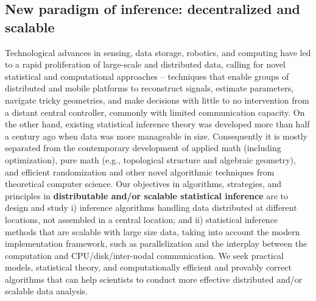 \documentclass[12pt]{article}
\begin{document}
\vspace*{-1em}

\subsection{New paradigm of inference: decentralized and scalable}
\label{sec:sub-decentralized}


Technological advances in sensing, data storage, robotics, and computing have led to a rapid proliferation of large-scale and distributed data, calling for novel statistical and computational approaches -- techniques that enable groups of distributed and mobile platforms to reconstruct signals, estimate parameters, navigate tricky geometries, and make decisions with little to no intervention from a distant central controller, commonly with limited communication capacity.
On the other hand, existing statistical inference theory was developed more than half a century ago when data was more manageable in size.  Consequently it is mostly separated from the contemporary development of applied math (including optimization), pure math (e.g., topological structure and algebraic geometry), and efficient randomization and other novel algorithmic techniques from theoretical computer science.
Our objectives in algorithms, strategies, and principles in {\bf distributable and/or scalable statistical inference}
are to design and study i) inference algorithms handling data distributed at different locations, not assembled in a central location; and ii) statistical inference methods that are scalable with large size data, taking into account the modern implementation framework, such as parallelization and the interplay between the computation and  CPU/disk/inter-nodal communication. We seek practical models, statistical theory, and computationally efficient and provably correct algorithms that can help scientists to conduct more effective distributed and/or scalable data analysis.
\end{document}
